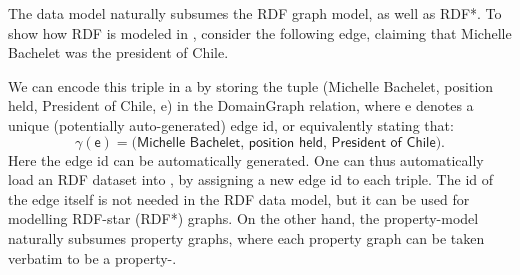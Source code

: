 The \data data model naturally subsumes the RDF graph model, as well as RDF*. To show how RDF is modeled in \datas, consider the following edge, claiming that Michelle Bachelet was the president of Chile.

\medskip
\begin{center}
\end{center}
\medskip

\noindent
We can encode this triple in a \data by storing the tuple \textsf{(Michelle Bachelet, position held, President of Chile, e)} in the \textsf{DomainGraph} relation, where \textsf{e} denotes a unique (potentially auto-generated) edge id, or equivalently stating that:
$$\gamma(\textsf{e}) = \textsf{(Michelle Bachelet, position held, President of Chile)}.$$
Here the edge id can be automatically generated. One can thus automatically load an RDF dataset into \Data, by assigning a new edge id to each triple. The id of the edge itself is not needed in the RDF data model, but it can be used for modelling RDF-star (RDF*) graphs. On the other hand, the property-\Data model naturally subsumes property graphs, where each property graph can be taken verbatim to be a property-\Data.



